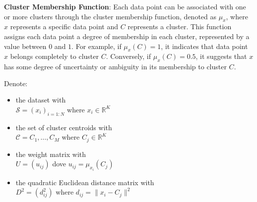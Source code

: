\noindent \textbf{Cluster Membership Function}: Each data point can be associated with one or more clusters through the cluster membership function, denoted as $\mu_x$, where $x$ represents a specific data point and $C$ represents a cluster. This function assigns each data point a degree of membership in each cluster, represented by a value between $0$ and $1$. For example, if $\mu_x(C) = 1$, it indicates that data point $x$ belongs completely to cluster $C$. Conversely, if $\mu_x(C) = 0.5$, it suggests that $x$ has some degree of uncertainty or ambiguity in its membership to cluster $C$.
\begin{notation}
Denote:
\begin{itemize}
\item the dataset with \\ $\mathcal{S} = (x_i)_{i=1:N}$ where $x_i\in\mathbb{R}^K$
\item the set of cluster centroids with \\ $\mathcal{C}={C_1,\dots,C_M}$ where $C_j\in\mathbb{R}^K$
\item the weight matrix with \\ $U=(u_{ij})$ dove $u_{ij}=\mu_{x_i}(C_j)$
\item the quadratic Euclidean distance matrix with \\ $D^2=(d^2_{ij})$ where $d_{ij}=\|x_i-C_j\|^2$
\end{itemize}
\end{notation}

